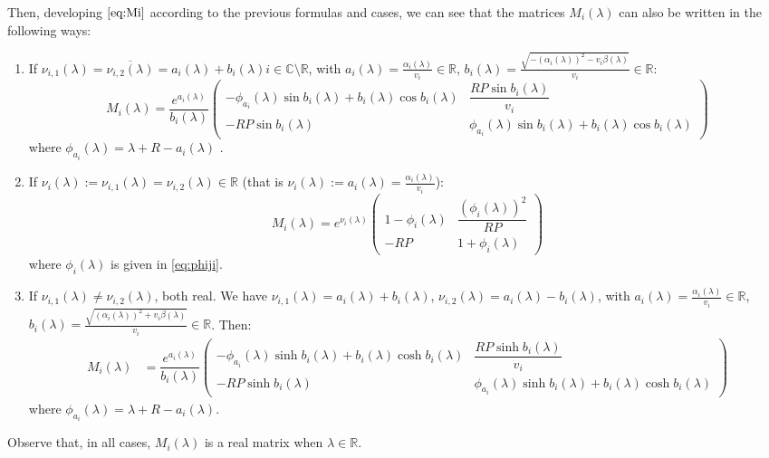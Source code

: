 \documentclass[a4paper]{article}
\newcommand{\X}[3]{#1_{#3,#2}}
\numberwithin{equation}{section}
\begin{document}
Then, developing $\eqref{eq:Mi}$ according to the previous formulas and cases, we can see that the matrices $M_i(\lambda)$ can also be written in the following ways:
\begin{enumerate}
\item If $\X{\nu}{1}{i}(\lambda)=\overline{\X{\nu}{2}{i}(\lambda)}=a_i(\lambda)+b_i(\lambda)i\in\mathbb{C}\setminus\mathbb{R}$, with $a_i(\lambda)=\frac{\alpha_i(\lambda)}{v_i}\in\mathbb{R}$, $b_i(\lambda)=\frac{\sqrt{-(\alpha_i(\lambda))^2-v_i \beta(\lambda)}}{v_i}\in\mathbb{R}$:
$$M_i(\lambda)= \dfrac{e^{a_i(\lambda)}}{b_i(\lambda)} \begin{pmatrix} -\phi_{a_i}(\lambda)\sin{b_i(\lambda)}+b_i(\lambda)\cos{b_i(\lambda)} & \dfrac{RP\sin{b_i(\lambda)}}{v_i} \\
                                        -RP\sin{b_i(\lambda)} & \phi_{a_i}(\lambda)\sin{b_i(\lambda)}+b_i(\lambda)\cos{b_i(\lambda)}
                      \end{pmatrix}$$
                      where $\phi_{a_i}(\lambda)=\lambda+R-a_i(\lambda)$ .
\item If $\nu_i(\lambda):=\X{\nu}{1}{i}(\lambda)=\X{\nu}{2}{i}(\lambda)\in\mathbb{R}$ (that is $\nu_i(\lambda):=a_i(\lambda)=\frac{\alpha_i(\lambda)}{v_i}$):
$$M_i(\lambda) = e^{\nu_i(\lambda)}\begin{pmatrix} 1-\phi_i(\lambda) & \dfrac{(\phi_i(\lambda))^2}{RP} \\
                                           -RP & 1+ \phi_i(\lambda) \end{pmatrix}
$$
where $\phi_i(\lambda)$ is given in \eqref{eq:phiji}.
\item If $\X{\nu}{1}{i}(\lambda)\neq\X{\nu}{2}{i}(\lambda)$, both real. We have $\X{\nu}{1}{i}(\lambda)= a_i(\lambda)+b_i(\lambda)$, $\X{\nu}{2}{i}(\lambda)= a_i(\lambda)-b_i(\lambda)$, with $a_i(\lambda)=\frac{\alpha_i(\lambda)}{v_i}\in\mathbb{R}$, $b_i(\lambda)=\frac{\sqrt{(\alpha_i(\lambda))^2+v_i \beta(\lambda)}}{v_i}\in\mathbb{R}$. Then:
\begin{align}\label{eq:Mi3}
M_i(\lambda) &=  \dfrac{e^{a_i(\lambda)}}{b_i(\lambda)} \begin{pmatrix} -\phi_{a_i}(\lambda)\sinh{b_i(\lambda)}+b_i(\lambda)\cosh{b_i(\lambda)} & \dfrac{RP\sinh{b_i(\lambda)}}{v_i} \\
                                        -RP\sinh{b_i(\lambda)} & \phi_{a_i}(\lambda)\sinh{b_i(\lambda)}+b_i(\lambda)\cosh{b_i(\lambda)}
                      \end{pmatrix}
\end{align}
where $\phi_{a_i}(\lambda)=\lambda+R-a_i(\lambda)$.
\end{enumerate}
Observe that, in all cases, $M_i(\lambda)$ is a real matrix when $\lambda\in\mathbb{R}$.
\end{document}
